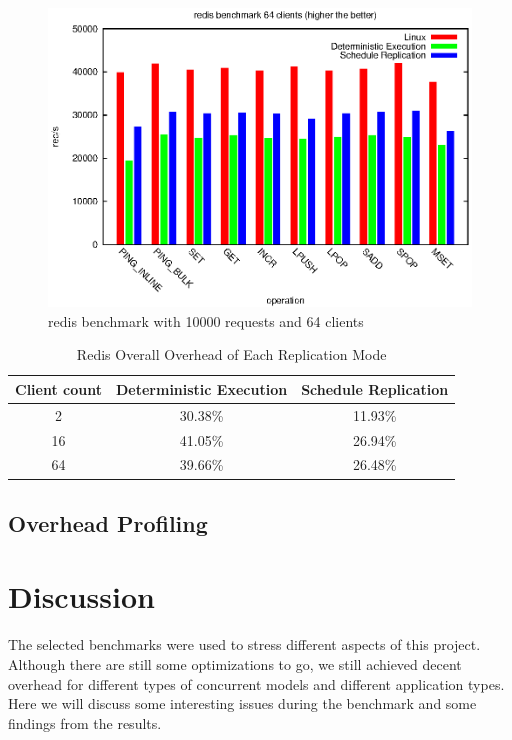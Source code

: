 \begin{figure}
\centering
\includegraphics[width=0.8\columnwidth]{figures/redis_64}
\caption{redis benchmark with 10000 requests and 64 clients}
\label{f:redis_64}
\end{figure}

\begin{table}
\caption{Redis Overall Overhead of Each Replication Mode}
\begin{center}
 \begin{tabular}{c | c | c}
Client count & Deterministic Execution & Schedule Replication \\ \hline
 2 & 30.38\% & 11.93\% \\ \hline
 16 & 41.05\% & 26.94\% \\ \hline
 64 & 39.66\% & 26.48\% \\ \hline
 \end{tabular}
\end{center}
\label{t:redis_overall}
\end{table}

\subsection{Overhead Profiling}

\section{Discussion}
The selected benchmarks were used to stress different aspects of this project. Although there are still some optimizations to go, we still achieved decent overhead for different types of concurrent models and different application types. Here we will discuss some interesting issues during the benchmark and some findings from the results.

